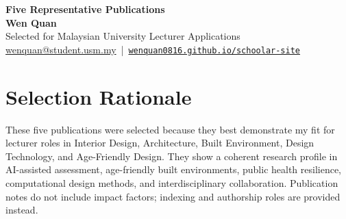 \documentclass[11pt,a4paper]{article}
\begin{document}
{\LARGE \textbf{Five Representative Publications}}\\[-1pt]
\textbf{Wen Quan}\\
\textcolor{subtle}{Selected for Malaysian University Lecturer Applications}\\
\href{mailto:wenquan@student.usm.my}{wenquan@student.usm.my} \,|\, 
\href{https://wenquan0816.github.io/schoolar-site/}{\nolinkurl{wenquan0816.github.io/schoolar-site}}

\section*{Selection Rationale}
These five publications were selected because they best demonstrate my fit for lecturer roles in Interior Design, Architecture, Built Environment, Design Technology, and Age-Friendly Design. They show a coherent research profile in AI-assisted assessment, age-friendly built environments, public health resilience, computational design methods, and interdisciplinary collaboration. Publication notes do not include impact factors; indexing and authorship roles are provided instead.
\end{document}
